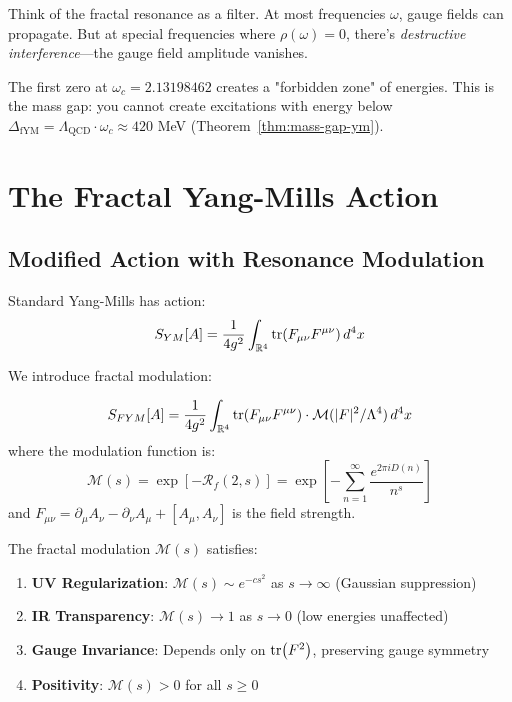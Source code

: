 \begin{intuitive}
Think of the fractal resonance as a filter. At most frequencies $\omega$, gauge fields can propagate. But at special frequencies where $\rho(\omega) = 0$, there's \textit{destructive interference}—the gauge field amplitude vanishes.

The first zero at $\omega_c = 2.13198462$ creates a "forbidden zone" of energies. This is the mass gap: you cannot create excitations with energy below $\Delta_{\mathrm{fYM}} = \Lambda_{\mathrm{QCD}} \cdot \omega_c \approx 420$ MeV (Theorem~\ref{thm:mass-gap-ym}).
\end{intuitive}

\section{The Fractal Yang-Mills Action}

\subsection{Modified Action with Resonance Modulation}

Standard Yang-Mills has action:
\begin{equation}
S_{YM}[A] = \frac{1}{4g^2} \int_{\mathbb{R}^4} \tr(F_{\mu\nu}F^{\mu\nu}) \, d^4x
\end{equation}

We introduce fractal modulation:

\begin{defn}\label{def:fym-action}
\begin{equation}
S_{FYM}[A] = \frac{1}{4g^2} \int_{\mathbb{R}^4} \tr(F_{\mu\nu}F^{\mu\nu}) \cdot \mathcal{M}(|F|^2/\Lambda^4) \, d^4x
\end{equation}
where the modulation function is:
\begin{equation}
\mathcal{M}(s) = \exp\left[-\mathcal{R}_f(2, s)\right] = \exp\left[-\sum_{n=1}^{\infty} \frac{e^{2\pi i D(n)}}{n^s}\right]
\end{equation}
and $F_{\mu\nu} = \partial_\mu A_\nu - \partial_\nu A_\mu + [A_\mu, A_\nu]$ is the field strength.
\end{defn}

\begin{proposition}\label{prop:modulation-properties}
The fractal modulation $\mathcal{M}(s)$ satisfies:
\begin{enumerate}
\item \textbf{UV Regularization}: $\mathcal{M}(s) \sim e^{-cs^2}$ as $s \to \infty$ (Gaussian suppression)
\item \textbf{IR Transparency}: $\mathcal{M}(s) \to 1$ as $s \to 0$ (low energies unaffected)
\item \textbf{Gauge Invariance}: Depends only on $\tr(F^2)$, preserving gauge symmetry
\item \textbf{Positivity}: $\mathcal{M}(s) > 0$ for all $s \geq 0$
\end{enumerate}
\end{proposition}

